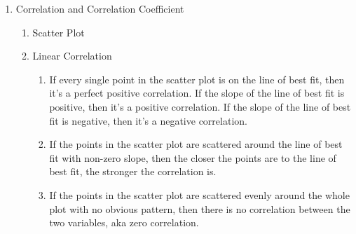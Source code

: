 \documentclass{report}
\begin{document}
\begin{multicols}{2}
\begin{enumerate}
    \item Correlation and Correlation Coefficient
          \begin{enumerate}
            \item Scatter Plot
                  \begin{center}
                  \end{center}
            \item Linear Correlation
                  \begin{enumerate}
                    \item If every single point in the scatter plot is on the line of best fit, then it's
                          a perfect positive correlation. If the slope of the line of best fit is
                          positive, then it's a positive correlation. If the slope of the line of best
                          fit is negative, then it's a negative correlation.

                    \item If the points in the scatter plot are scattered around the line of best fit
                          with non-zero slope, then the closer the points are to the line of best fit,
                          the stronger the correlation is.

                    \item If the points in the scatter plot are scattered evenly around the whole plot
                          with no obvious pattern, then there is no correlation between the two
                          variables, aka zero correlation.
                  \end{enumerate}


\end{enumerate}
\end{enumerate}
\end{multicols}
\end{document}
